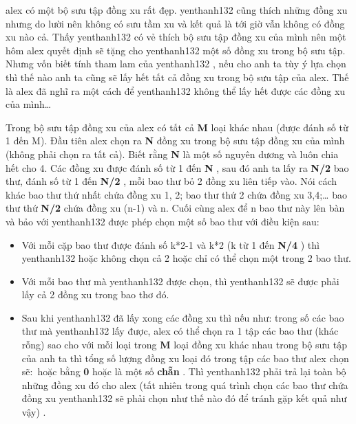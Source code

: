 



alex   có một bộ sưu tập đồng xu rất đẹp.   yenthanh132   cũng thích những đồng xu nhưng do lười nên không có sưu tầm xu và kết quả là tới giờ vẫn không có đồng xu nào cả. Thấy   yenthanh132   có vẻ thích bộ sưu tập đồng xu của mình nên một hôm   alex   quyết định sẽ tặng cho   yenthanh132   một số đồng xu trong bộ sưu tập. Nhưng vốn biết tính tham lam của   yenthanh132   , nếu cho anh ta tùy ý lựa chọn thì thế nào anh ta cũng sẽ lấy hết tất cả đồng xu trong bộ sưu tập của   alex.   Thế là   alex   đã nghĩ ra một cách để   yenthanh132   không thể lấy hết được các đồng xu của mình…  

   Trong bộ sưu tập đồng xu của   alex   có tất cả   \textbf{    M   }   loại khác nhau (được đánh số từ 1 đến M). Đầu tiên   alex   chọn ra   \textbf{    N   }   đồng xu trong bộ sưu tập đồng xu của mình (không phải chọn ra tất cả). Biết rằng   \textbf{    N   }   là một số nguyên dương và luôn chia hết cho 4. Các đồng xu được đánh số từ 1 đến   \textbf{    N   }   , sau đó anh ta lấy ra   \textbf{    N/2   }   bao thư, đánh số từ 1 đến   \textbf{    N/2   }   , mỗi bao thư bỏ 2 đồng xu liên tiếp vào. Nói cách khác bao thư thứ nhất chứa đồng xu 1, 2; bao thư thứ 2 chứa đồng xu 3,4;… bao thư thứ   \textbf{    N/2   }   chứa đồng xu (n-1) và n. Cuối cùng   alex   để n bao thư này lên bàn và bảo với   yenthanh132   được phép chọn một số bao thư với điều kiện sau:  
\begin{itemize}
	\item     Với mỗi cặp bao thư được đánh số k*2-1 và k*2 (k từ 1 đến    \textbf{     N/4    }    ) thì    yenthanh132    hoặc không chọn cả 2 hoặc chỉ có thể chọn một trong 2 bao thư.   
	\item     Với mỗi bao thư mà    yenthanh132    được chọn, thì    yenthanh132    sẽ được phải lấy cả 2 đồng xu trong bao thơ đó.   
	\item     Sau khi    yenthanh132    đã lấy xong các đồng xu thì nếu như: trong số các bao thư mà    yenthanh132    lấy được,    alex    có thể chọn ra 1 tập các bao thư (khác rỗng) sao cho với mỗi loại trong    \textbf{     M    }    loại đồng xu khác nhau trong bộ sưu tập của anh ta thì tổng số lượng đồng xu loại đó trong tập các bao thư    alex    chọn sẽ: hoặc bằng    \textbf{     0    }    hoặc là một số    \textbf{     chẵn    }    . Thì    yenthanh132    phải trả lại toàn bộ những đồng xu đó cho    alex    (tất nhiên trong quá trình chọn các bao thư chứa đồng xu    yenthanh132    sẽ phải chọn như thế nào đó để tránh gặp kết quả như vậy)    .
\end{itemize}

